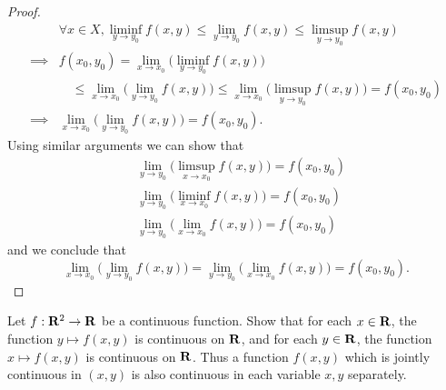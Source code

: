 \begin{proof}
\begin{align*}
                 & \forall x \in X, \liminf_{y \to y_0} f(x, y) \leq \lim_{y \to y_0} f(x, y) \leq \limsup_{y \to y_0} f(x, y)                              \\
        \implies & f(x_0, y_0) = \lim_{x \to x_0} \big(\liminf_{y \to y_0} f(x, y)\big)                                                                     \\
                 & \quad \leq \lim_{x \to x_0} \big(\lim_{y \to y_0} f(x, y)\big) \leq \lim_{x \to x_0} \big(\limsup_{y \to y_0} f(x, y)\big) = f(x_0, y_0) \\
        \implies & \lim_{x \to x_0} \big(\lim_{y \to y_0} f(x, y)\big) = f(x_0, y_0).
    \end{align*}
    Using similar arguments we can show that
    \begin{align*}
         & \lim_{y \to y_0} \big(\limsup_{x \to x_0} f(x, y)\big) = f(x_0, y_0) \\
         & \lim_{y \to y_0} \big(\liminf_{x \to x_0} f(x, y)\big) = f(x_0, y_0) \\
         & \lim_{y \to y_0} \big(\lim_{x \to x_0} f(x, y)\big) = f(x_0, y_0)
    \end{align*}
    and we conclude that
    \[
        \lim_{x \to x_0} \big(\lim_{y \to y_0} f(x, y)\big) = \lim_{y \to y_0} \big(\lim_{x \to x_0} f(x, y)\big) = f(x_0, y_0).
    \]
\end{proof}

\begin{exercise}\label{ex 2.2.10}
    Let \(f : \mathbf{R}^2 \to \mathbf{R}\) be a continuous function.
    Show that for each \(x \in \mathbf{R}\), the function \(y \mapsto f(x, y)\) is continuous on \(\mathbf{R}\), and for each \(y \in \mathbf{R}\), the function \(x \mapsto f(x, y)\) is continuous on \(\mathbf{R}\).
    Thus a function \(f(x, y)\) which is jointly continuous in \((x, y)\) is also continuous in each variable \(x, y\) separately.
\end{exercise}

